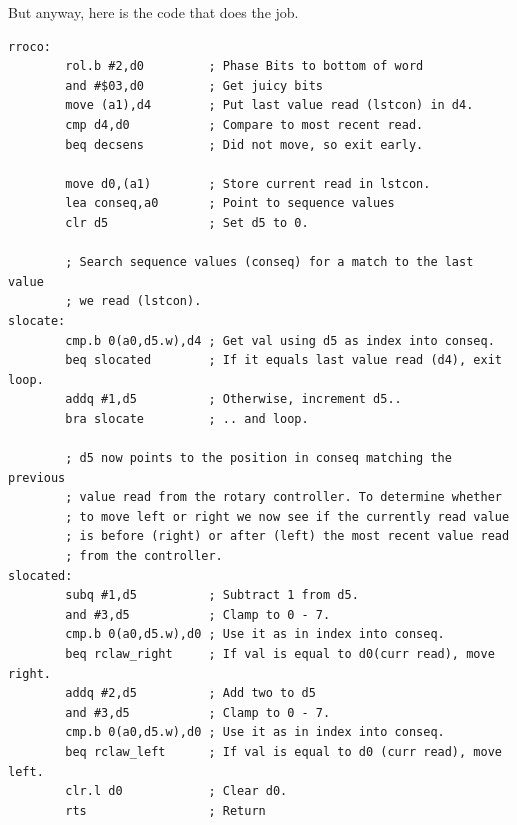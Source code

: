 But anyway, here is the code that does the job.
\begin{lstlisting}
rroco:
        rol.b #2,d0         ; Phase Bits to bottom of word
        and #$03,d0         ; Get juicy bits
        move (a1),d4        ; Put last value read (lstcon) in d4.
        cmp d4,d0           ; Compare to most recent read.
        beq decsens         ; Did not move, so exit early.

        move d0,(a1)        ; Store current read in lstcon.
        lea conseq,a0       ; Point to sequence values
        clr d5              ; Set d5 to 0.

        ; Search sequence values (conseq) for a match to the last value
        ; we read (lstcon).
slocate:
        cmp.b 0(a0,d5.w),d4 ; Get val using d5 as index into conseq.
        beq slocated        ; If it equals last value read (d4), exit loop.
        addq #1,d5          ; Otherwise, increment d5..
        bra slocate         ; .. and loop.
    
        ; d5 now points to the position in conseq matching the previous
        ; value read from the rotary controller. To determine whether 
        ; to move left or right we now see if the currently read value
        ; is before (right) or after (left) the most recent value read
        ; from the controller.
slocated:
        subq #1,d5          ; Subtract 1 from d5.
        and #3,d5           ; Clamp to 0 - 7.
        cmp.b 0(a0,d5.w),d0 ; Use it as in index into conseq.
        beq rclaw_right     ; If val is equal to d0(curr read), move right.
        addq #2,d5          ; Add two to d5
        and #3,d5           ; Clamp to 0 - 7.
        cmp.b 0(a0,d5.w),d0 ; Use it as in index into conseq.
        beq rclaw_left      ; If val is equal to d0 (curr read), move left.
        clr.l d0            ; Clear d0.
        rts                 ; Return
\end{lstlisting}
